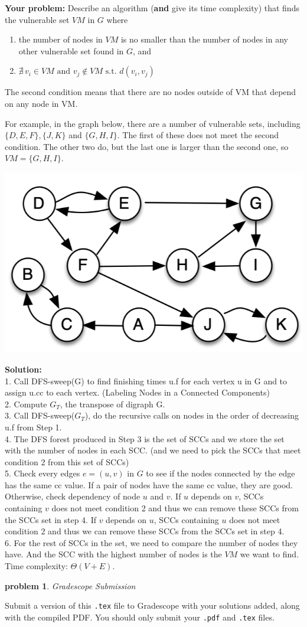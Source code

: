 \documentclass[10pt]{article}
\newcommand{\solution}[1]{\color{blue}\hfill\break\noindent\textbf{Solution:} #1\color{black}}
\newtheorem{problem}{\sc\color{cit}problem}
\begin{document}
\textbf{Your problem:}  Describe an algorithm (\textbf{and} give its time complexity) that finds the vulnerable set $VM$ in $G$ where 
\begin{enumerate}
\item the number of nodes in $VM$ is no smaller than the number of nodes in any other vulnerable set found in $G$, and
\item $\nexists \, v_i \in VM \textrm{ and } v_j \notin VM \textrm{ s.t. } d(v_i, v_j)$
\end{enumerate}
The second condition means that there are no nodes outside of VM that depend on any node in VM.

For example, in the graph below, there are a number of vulnerable sets, including $\{D, E, F\}, \{J, K\}$ and $\{G, H, I\}$.   The first of these does not meet the second condition. The other two do, but the last one is larger than the second one, so $VM=\{G, H, I\}$.

 
 \includegraphics[width = 0.4\columnwidth]{vulnerable-sets.png}

\solution{
    \\
    1. Call DFS-sweep(G) to find finishing times u.f for each vertex u in G and to assign u.cc to each vertex. (Labeling Nodes in a Connected Components)\\
    2. Compute $G_T$, the transpose of digraph G. \\
    3. Call DFS-sweep($G_T$), do the recursive calls on nodes in the order
of decreasing u.f from Step 1. \\
    4. The DFS forest produced in Step 3 is the set of SCCs and we store the set with the number of nodes in each SCC. (and we need to pick the SCCs that meet condition 2 from this set of SCCs)\\
    5. Check every edges $e = (u, v)$ in $G$ to see if the nodes connected by the edge has the same cc value. If a pair of nodes have the same cc value, they are good. Otherwise, check dependency of node $u$ and $v$. If $u$ depends on $v$, SCCs containing $v$ does not meet condition 2 and thus we can remove these SCCs from the SCCs set in step 4. If $v$ depends on $u$, SCCs containing $u$ does not meet condition 2 and thus we can remove these SCCs from the SCCs set in step 4.\\
    6. For the rest of SCCs in the set, we need to compare the number of nodes they have. And the SCC with the highest number of nodes is the $VM$ we want to find.\\
    
    Time complexity: $\Theta(V+E)$.
}


\begin{problem} Gradescope Submission \end{problem}
Submit a version of this \verb|.tex| file to Gradescope with your solutions added, along with the compiled PDF.  You should only submit your \verb|.pdf| and \verb|.tex| files.
\end{document}
